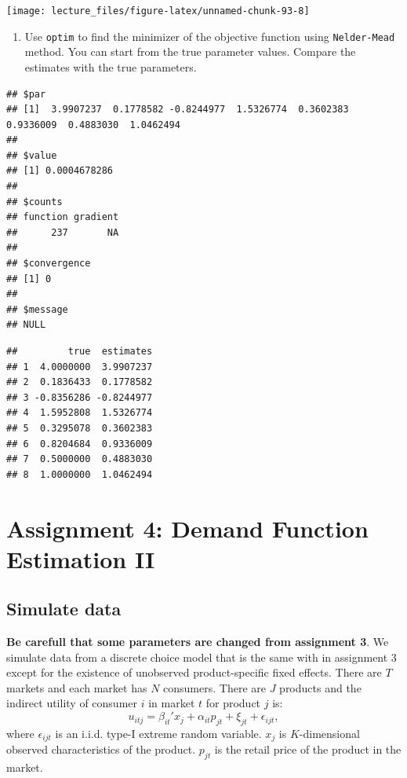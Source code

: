 \documentclass[
]{book}
\providecommand{\tightlist}{%
  \setlength{\itemsep}{0pt}\setlength{\parskip}{0pt}}
\begin{document}
\begin{center}\texttt{[image: lecture\_files/figure-latex/unnamed-chunk-93-8]} \end{center}

\begin{enumerate}
\def\labelenumi{\arabic{enumi}.}
\setcounter{enumi}{7}
\tightlist
\item
  Use \texttt{optim} to find the minimizer of the objective function using \texttt{Nelder-Mead} method. You can start from the true parameter values. Compare the estimates with the true parameters.
\end{enumerate}

\begin{verbatim}
## $par
## [1]  3.9907237  0.1778582 -0.8244977  1.5326774  0.3602383  0.9336009  0.4883030  1.0462494
## 
## $value
## [1] 0.0004678286
## 
## $counts
## function gradient 
##      237       NA 
## 
## $convergence
## [1] 0
## 
## $message
## NULL
\end{verbatim}

\begin{verbatim}
##         true  estimates
## 1  4.0000000  3.9907237
## 2  0.1836433  0.1778582
## 3 -0.8356286 -0.8244977
## 4  1.5952808  1.5326774
## 5  0.3295078  0.3602383
## 6  0.8204684  0.9336009
## 7  0.5000000  0.4883030
## 8  1.0000000  1.0462494
\end{verbatim}

\hypertarget{assignment4}{%
\chapter{Assignment 4: Demand Function Estimation II}\label{assignment4}}

\hypertarget{simulate-data-3}{%
\section{Simulate data}\label{simulate-data-3}}

\textbf{Be carefull that some parameters are changed from assignment 3}. We simulate data from a discrete choice model that is the same with in assignment 3 except for the existence of unobserved product-specific fixed effects. There are \(T\) markets and each market has \(N\) consumers. There are \(J\) products and the indirect utility of consumer \(i\) in market \(t\) for product \(j\) is:
\[
u_{itj} = \beta_{it}' x_j + \alpha_{it} p_{jt} + \xi_{jt} + \epsilon_{ijt},
\]
where \(\epsilon_{ijt}\) is an i.i.d. type-I extreme random variable. \(x_j\) is \(K\)-dimensional observed characteristics of the product. \(p_{jt}\) is the retail price of the product in the market.
\end{document}
